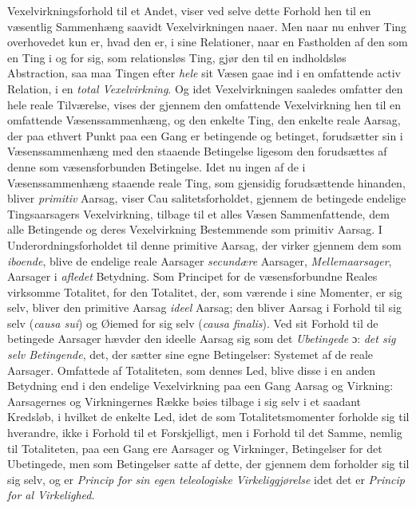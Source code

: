 Vexelvirkningsforhold til et Andet, viser ved selve dette Forhold hen til en
væsentlig Sammenhæng saavidt Vexelvirkningen naaer. Men naar nu enhver Ting
overhovedet kun er, hvad den er, i sine Relationer, naar en Fastholden af den
som en Ting i og for sig, som relationsløs Ting, gjør den til en indholdsløs
Abstraction, saa maa Tingen efter \emph{hele} sit Væsen gaae ind i en
omfattende activ Relation, i en \emph{total Vexelvirkning}. Og idet
Vexelvirkningen saaledes omfatter den hele reale Tilværelse, vises der gjennem
den omfattende Vexelvirkning hen til en omfattende Væsenssammenhæng, og den
enkelte Ting, den enkelte reale Aarsag, der paa ethvert Punkt paa een Gang er
betingende og betinget, forudsætter sin i Væsenssammenhæng med den staaende
Betingelse ligesom den forudsættes af denne som væsensforbunden Betingelse.
Idet nu ingen af de i Væsenssammenhæng staaende reale Ting, som gjensidig
forudsættende hinanden, bliver \emph{primitiv} Aarsag, viser Cau\-%
salitetsforholdet, gjennem de betingede endelige Tingsaarsagers
Vexelvirkning, tilbage til et alles Væsen Sammenfattende, dem alle Betingende
og deres Vexelvirkning Bestemmende som primitiv Aarsag. I
Underordningsforholdet til denne primitive Aarsag, der virker gjennem dem som
\emph{iboende}, blive de endelige reale Aarsager \emph{secundære} Aarsager,
\emph{Mellemaarsager}, Aarsager i \emph{afledet} Betydning. Som Principet for
de væsensforbundne Reales virksomme Totalitet, for den Totalitet, der, som
værende i sine Momenter, er sig selv, bliver den primitive Aarsag \emph{ideel}
Aarsag; den bliver Aarsag i Forhold til sig selv (\emph{\textit{causa sui}})
og Øiemed for sig selv (\emph{\textit{causa finalis}}). Ved sit Forhold til de
betingede Aarsager hævder den ideelle Aarsag sig som det \emph{Ubetingede} ɔ:
\emph{det sig selv Betingende}, det, der sætter sine egne Betingelser:
Systemet af de reale Aarsager. Omfattede af Totaliteten, som dennes Led, blive
disse i en anden Betydning end i den endelige Vexelvirkning paa een Gang
Aarsag og Virkning: Aarsagernes og Virkningernes Række bøies tilbage i sig
selv i et saadant Kredsløb, i hvilket de enkelte Led, idet de som
Totalitetsmomenter forholde sig til hverandre, ikke i Forhold til et
Forskjelligt, men i Forhold til det Samme, nemlig til Totaliteten, paa een
Gang ere Aarsager og Virkninger, Betingelser for det Ubetingede, men som
Betingelser satte af dette, der gjennem dem forholder sig til sig selv, og er
\emph{Princip for sin egen teleologiske Virkeliggjørelse} idet det er
\emph{Princip for al Virkelighed}.

